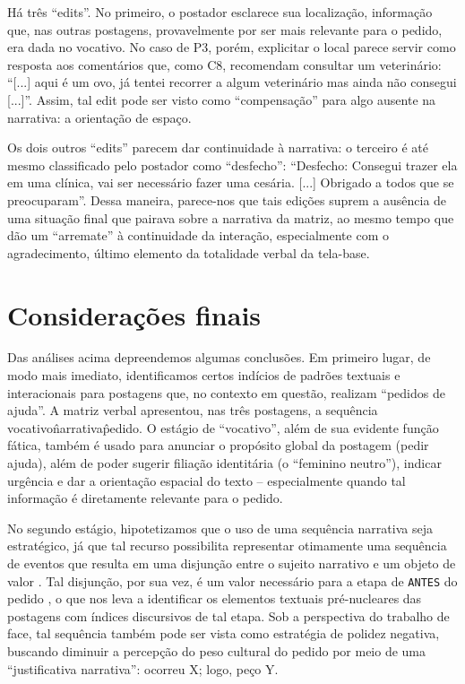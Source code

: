 \documentclass{textolivre}
\begin{document}
Há três “edits”. No primeiro, o postador esclarece sua localização, informação que, nas outras postagens, provavelmente por ser mais relevante para o pedido, era dada no vocativo. No caso de P3, porém, explicitar o local parece servir como resposta aos comentários que, como C8, recomendam consultar um veterinário: “[...] aqui é um ovo, já tentei recorrer a algum veterinário mas ainda não consegui [...]”. Assim, tal edit pode ser visto como “compensação” para algo ausente na narrativa: a orientação de espaço.

Os dois outros “edits” parecem dar continuidade à narrativa: o terceiro é até mesmo classificado pelo postador como “desfecho”: “Desfecho: Consegui trazer ela em uma clínica, vai ser necessário fazer uma cesária. [...] Obrigado a todos que se preocuparam”. Dessa maneira, parece-nos que tais edições suprem a ausência de uma situação final que pairava sobre a narrativa da matriz, ao mesmo tempo que dão um “arremate” à continuidade da interação, especialmente com o agradecimento, último elemento da totalidade verbal da tela-base.

\section{Considerações finais}\label{sec-consideracoes}

Das análises acima depreendemos algumas conclusões. Em primeiro lugar, de modo mais imediato, identificamos certos indícios de padrões textuais e interacionais para postagens que, no contexto em questão, realizam “pedidos de ajuda”. A matriz verbal apresentou, nas três postagens, a sequência vocativo\^narrativa\^pedido. O estágio de “vocativo”, além de sua evidente função fática, também é usado para anunciar o propósito global da postagem (pedir ajuda), além de poder sugerir filiação identitária (o “feminino neutro”), indicar urgência e dar a orientação espacial do texto – especialmente quando tal informação é diretamente relevante para o pedido.

No segundo estágio, hipotetizamos que o uso de uma sequência narrativa seja estratégico, já que tal recurso possibilita representar otimamente uma sequência de eventos que resulta em uma disjunção entre o sujeito narrativo e um objeto de valor \parencites{adam1992}[cf.][]{greimas1973}. Tal disjunção, por sua vez, é um valor necessário para a etapa de \texttt{ANTES} do pedido \cite{panther2017}, o que nos leva a identificar os elementos textuais pré-nucleares das postagens com índices discursivos de tal etapa. Sob a perspectiva do trabalho de face, tal sequência também pode ser vista como estratégia de polidez negativa, buscando diminuir a percepção do peso cultural do pedido por meio de uma “justificativa narrativa”: ocorreu X; logo, peço Y.
\end{document}
